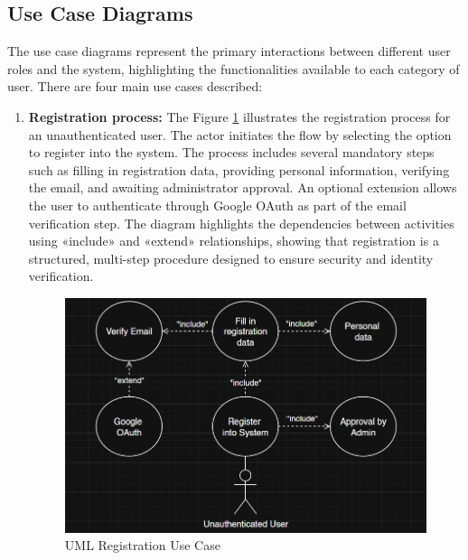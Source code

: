 \subsection{Use Case Diagrams}
The use case diagrams represent the primary interactions between different user roles and the system, highlighting the functionalities available to each category of user. There are four main use cases described:
\begin{enumerate}
    \item \textbf{Registration process:} The Figure \ref{uml-use-registration} illustrates the registration process for an unauthenticated user. The actor initiates the flow by selecting the option to register into the system. The process includes several mandatory steps such as filling in registration data, providing personal information, verifying the email, and awaiting administrator approval. An optional extension allows the user to authenticate through Google OAuth as part of the email verification step. The diagram highlights the dependencies between activities using «include» and «extend» relationships, showing that registration is a structured, multi-step procedure designed to ensure security and identity verification.
    \begin{figure}[H]
        \centering
        \includegraphics[width=18cm]{"images/umlDiagrams/uml-use-registration.png"}
        \caption{UML Registration Use Case}
        \label{uml-use-registration}
    \end{figure}


\end{enumerate}
